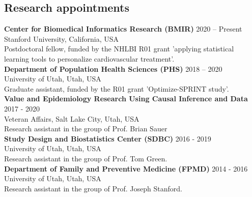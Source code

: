 \documentclass[margin,line]{res}
\begin{document}
\begin{resume}
\section{\sc Research appointments}
\textbf{Center for Biomedical Informatics Research (BMIR)} \hfill 2020 – Present\\
Stanford University, California, USA  \\
Postdoctoral fellow, funded by the NHLBI R01 grant 'applying statistical learning tools to personalize cardiovascular treatment'. \\
\textbf{Department of Population Health Sciences (PHS)} \hfill 2018 – 2020\\
University of Utah, Utah, USA\\
Graduate assistant, funded by the R01 grant 'Optimize-SPRINT study'.\\
\textbf{Value and Epidemiology Research Using Causal Inference and Data} \hfill 2017 - 2020\\
Veteran Affairs, Salt Lake City, Utah, USA\\ 
Research assistant in the group of Prof. Brian Sauer \\
\textbf{Study Design and Biostatistics Center (SDBC)} \hfill 2016 - 2019\\
University of Utah, Utah, USA\\
Research assistant in the group of Prof. Tom Green. \\
\textbf{Department of Family and Preventive Medicine (FPMD)}  \hfill 2014 - 2016\\
University of Utah, Utah, USA\\
Research assistant in the group of Prof. Joseph Stanford. 



\end{resume}
\end{document}
